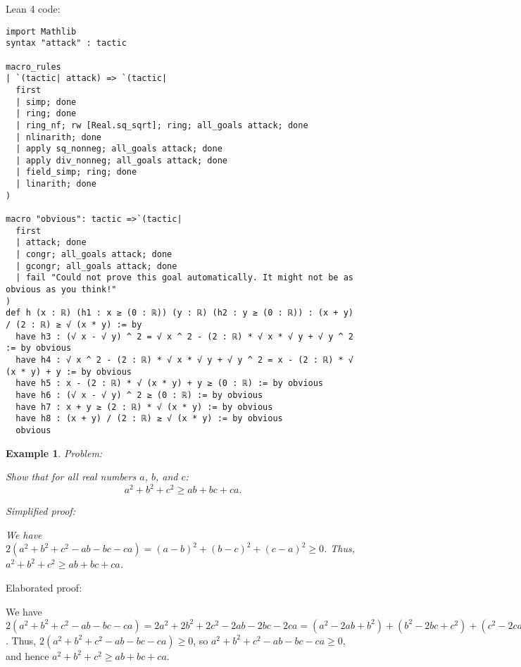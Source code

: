 \documentclass{article}
\newtheorem{example}{Example}
\begin{document}
Lean 4 code:
\begin{tcolorbox}[colback=white!10, width=\linewidth]
\begin{lstlisting}[language=Lean4]
import Mathlib
syntax "attack" : tactic

macro_rules
| `(tactic| attack) => `(tactic|
  first
  | simp; done
  | ring; done
  | ring_nf; rw [Real.sq_sqrt]; ring; all_goals attack; done
  | nlinarith; done
  | apply sq_nonneg; all_goals attack; done
  | apply div_nonneg; all_goals attack; done
  | field_simp; ring; done
  | linarith; done
)

macro "obvious": tactic =>`(tactic|
  first
  | attack; done
  | congr; all_goals attack; done
  | gcongr; all_goals attack; done
  | fail "Could not prove this goal automatically. It might not be as obvious as you think!"
)
def h (x : ℝ) (h1 : x ≥ (0 : ℝ)) (y : ℝ) (h2 : y ≥ (0 : ℝ)) : (x + y) / (2 : ℝ) ≥ √ (x * y) := by
  have h3 : (√ x - √ y) ^ 2 = √ x ^ 2 - (2 : ℝ) * √ x * √ y + √ y ^ 2 := by obvious
  have h4 : √ x ^ 2 - (2 : ℝ) * √ x * √ y + √ y ^ 2 = x - (2 : ℝ) * √ (x * y) + y := by obvious
  have h5 : x - (2 : ℝ) * √ (x * y) + y ≥ (0 : ℝ) := by obvious
  have h6 : (√ x - √ y) ^ 2 ≥ (0 : ℝ) := by obvious
  have h7 : x + y ≥ (2 : ℝ) * √ (x * y) := by obvious
  have h8 : (x + y) / (2 : ℝ) ≥ √ (x * y) := by obvious
  obvious

\end{lstlisting}
\end{tcolorbox}


\begin{example}
Problem:
\begin{tcolorbox}[colback=yellow!10, width=\linewidth]
Show that for all real numbers $a$, $b$, and $c$:
    $$a^2 + b^2 + c^2 \geq ab + bc + ca.$$
\end{tcolorbox}

Simplified proof:
\begin{tcolorbox}[colback=blue!10, width=\linewidth]
We have $2(a^2 + b^2 + c^2 - ab - bc - ca) = (a-b)^2 + (b-c)^2 + (c-a)^2 \ge 0$. Thus, $a^2 + b^2 + c^2 \geq ab + bc + ca$.
\end{tcolorbox}
\end{example}

Elaborated proof:
\begin{tcolorbox}[colback=green!10, width=\linewidth]
We have $2(a^2 + b^2 + c^2 - ab - bc - ca) = 2a^2 + 2b^2 + 2c^2 - 2ab - 2bc - 2ca = (a^2 - 2ab + b^2) + (b^2 - 2bc + c^2) + (c^2 - 2ca + a^2) = (a-b)^2 + (b-c)^2 + (c-a)^2 \ge 0$. Thus, $2(a^2 + b^2 + c^2 - ab - bc - ca) \ge 0$, so $a^2 + b^2 + c^2 - ab - bc - ca \ge 0$, and hence $a^2 + b^2 + c^2 \geq ab + bc + ca$.
\end{tcolorbox}
\end{document}
